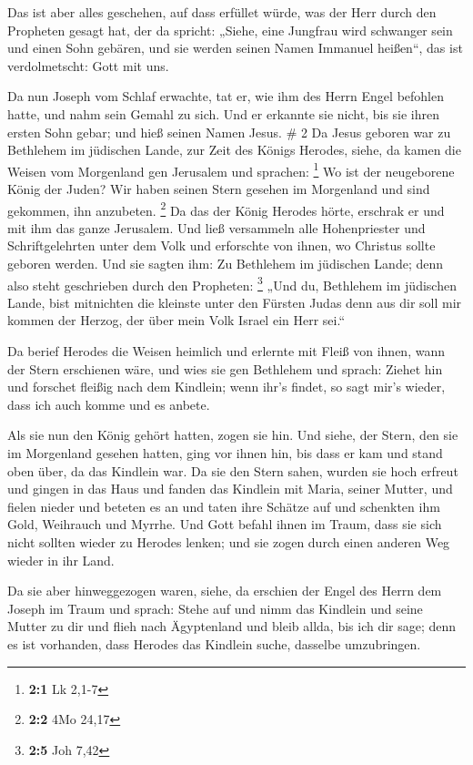  Das ist aber alles geschehen, auf dass erfüllet würde,
was der Herr durch den Propheten gesagt hat, der da spricht:
 „Siehe, eine Jungfrau wird schwanger sein und einen Sohn
gebären, und sie werden seinen Namen Immanuel heißen``, das ist
verdolmetscht: Gott mit uns.

 Da nun Joseph vom Schlaf erwachte, tat er, wie ihm des
Herrn Engel befohlen hatte, und nahm sein Gemahl zu sich.
 Und er erkannte sie nicht, bis sie ihren ersten Sohn
gebar; und hieß seinen Namen Jesus. \# 2  Da Jesus geboren
war zu Bethlehem im jüdischen Lande, zur Zeit des Königs Herodes, siehe,
da kamen die Weisen vom Morgenland gen Jerusalem und sprachen:
\footnote{\textbf{2:1} Lk 2,1-7}  Wo ist der neugeborene
König der Juden? Wir haben seinen Stern gesehen im Morgenland und sind
gekommen, ihn anzubeten. \footnote{\textbf{2:2} 4Mo 24,17}
 Da das der König Herodes hörte, erschrak er und mit ihm
das ganze Jerusalem.  Und ließ versammeln alle
Hohenpriester und Schriftgelehrten unter dem Volk und erforschte von
ihnen, wo Christus sollte geboren werden.  Und sie sagten
ihm: Zu Bethlehem im jüdischen Lande; denn also steht geschrieben durch
den Propheten: \footnote{\textbf{2:5} Joh 7,42}  „Und du,
Bethlehem im jüdischen Lande, bist mitnichten die kleinste unter den
Fürsten Judas denn aus dir soll mir kommen der Herzog, der über mein
Volk Israel ein Herr sei.``

 Da berief Herodes die Weisen heimlich und erlernte mit
Fleiß von ihnen, wann der Stern erschienen wäre,  und wies
sie gen Bethlehem und sprach: Ziehet hin und forschet fleißig nach dem
Kindlein; wenn ihr's findet, so sagt mir's wieder, dass ich auch komme
und es anbete.

 Als sie nun den König gehört hatten, zogen sie hin. Und
siehe, der Stern, den sie im Morgenland gesehen hatten, ging vor ihnen
hin, bis dass er kam und stand oben über, da das Kindlein war.
 Da sie den Stern sahen, wurden sie hoch erfreut
 und gingen in das Haus und fanden das Kindlein mit
Maria, seiner Mutter, und fielen nieder und beteten es an und taten ihre
Schätze auf und schenkten ihm Gold, Weihrauch und Myrrhe.
 Und Gott befahl ihnen im Traum, dass sie sich nicht
sollten wieder zu Herodes lenken; und sie zogen durch einen anderen Weg
wieder in ihr Land.

 Da sie aber hinweggezogen waren, siehe, da erschien der
Engel des Herrn dem Joseph im Traum und sprach: Stehe auf und nimm das
Kindlein und seine Mutter zu dir und flieh nach Ägyptenland und bleib
allda, bis ich dir sage; denn es ist vorhanden, dass Herodes das
Kindlein suche, dasselbe umzubringen.

